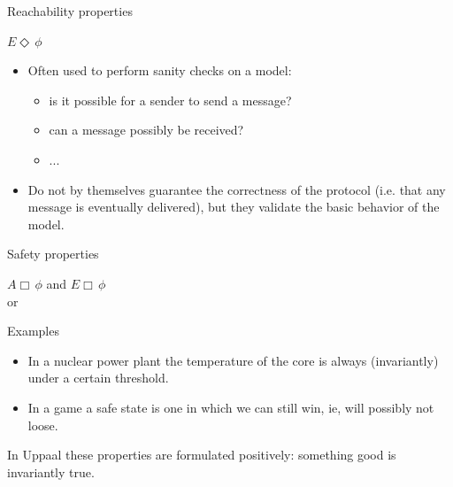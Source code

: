 \documentclass[aspectratio=169]{beamer}
\begin{document}
\begin{slide}{Reachability properties}
\small

\begin{block}{$E \Diamond\, \phi$}

\begin{itemize}
\item  Often used to perform sanity checks  on a model:
\begin{itemize}
\item \alert{is it possible for a sender to send a message?}
 \item \alert{can a message possibly be received?}
 \item ...
 \end{itemize}
 \item  Do not by themselves guarantee the correctness of the protocol (i.e. \alert{that any message is eventually delivered}), 
but they validate the basic behavior of the model.
 \end{itemize}
\end{block}

\end{slide}


\begin{slide}{Safety properties}
\small

\begin{block}{$A \Box\, \phi$ and $E \Box\, \phi$}
\vspace{5mm}
\\
 or 
\vspace{5mm}

Examples\\
\begin{itemize}
\item \alert{In a nuclear power plant the temperature of the core is always (invariantly) under a certain threshold}.
\item \alert{In a game a safe state is one in which we can still win, ie, will possibly not loose}.
\end{itemize}

In Uppaal these properties are formulated positively: something good is invariantly true.
\end{block}

\end{slide}
\end{document}
